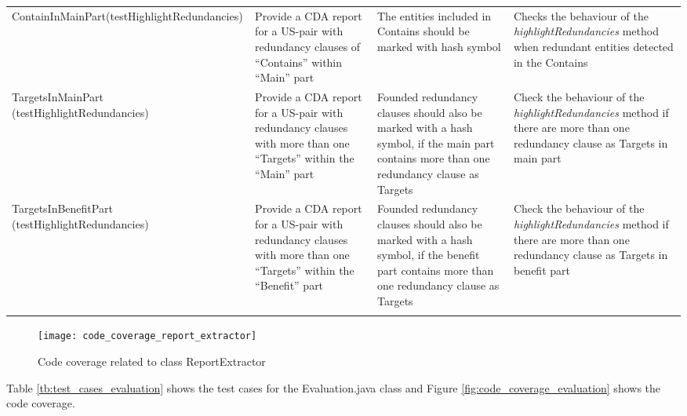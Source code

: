 \begin{tabularx}{\textwidth}{X  X  X  X}
			ContainInMainPart\newline(testHighlightRedundancies)&Provide a CDA report for a US-pair with redundancy clauses of \enquote{Contains} within \enquote{Main} part&The entities included in Contains should be marked with hash symbol&Checks the behaviour of the \textit{highlightRedundancies} method when redundant entities detected in the Contains\\
			
			TargetsInMainPart \newline(testHighlightRedundancies)&Provide a CDA report for a US-pair with redundancy clauses with more than one \enquote{Targets} within the \enquote{Main} part&Founded redundancy clauses should also be marked with a hash symbol, if the main part contains more than one redundancy clause as Targets&Check the behaviour of the \textit{highlightRedundancies} method if there are more than one redundancy clause as Targets in main part\\
			
			TargetsInBenefitPart \newline(testHighlightRedundancies)&Provide a CDA report for a US-pair with redundancy clauses with more than one \enquote{Targets} within the \enquote{Benefit} part&Founded redundancy clauses should also be marked with a hash symbol, if the benefit part contains more than one redundancy clause as Targets&Check the behaviour of the \textit{highlightRedundancies} method if there are more than one redundancy clause as Targets in benefit part\\
			
			
			\hline
				\caption{Test cases for ReportExtractor  class}\label{tb:test_cases_report_extractor}
		\end{tabularx}		
		\endgroup

\begin{figure}[h]
	\centering
	\texttt{[image: code\_coverage\_report\_extractor]}
	\caption{Code coverage related to class ReportExtractor}\label{fig:code_coverage_report_extractor}
\end{figure} 

Table \ref{tb:test_cases_evaluation} shows the test cases for the Evaluation.java class and Figure \ref{fig:code_coverage_evaluation} shows the code coverage.

\begingroup
\centering
\scriptsize
\renewcommand{\arraystretch}{1,5} 
\keepXColumns

